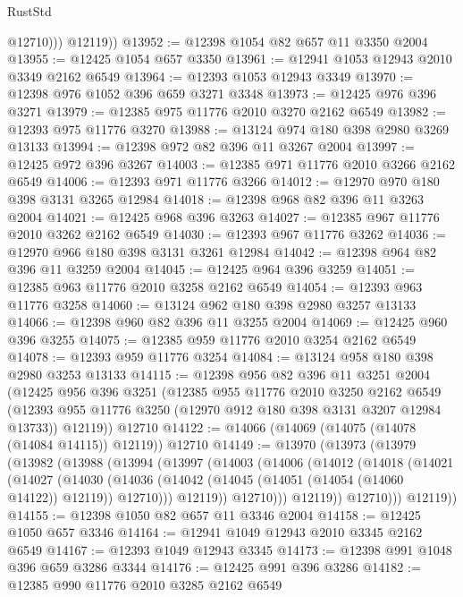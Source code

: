 \begin{lexlean}{RustStd}
\begin{coremodule}
              @12710)))
        @12119))
@13952 := @12398 @1054 @82 @657 @11 @3350 @2004
@13955 := @12425 @1054 @657 @3350
@13961 := @12941 @1053 @12943 @2010 @3349 @2162 @6549
@13964 := @12393 @1053 @12943 @3349
@13970 := @12398 @976 @1052 @396 @659 @3271 @3348
@13973 := @12425 @976 @396 @3271
@13979 := @12385 @975 @11776 @2010 @3270 @2162 @6549
@13982 := @12393 @975 @11776 @3270
@13988 := @13124 @974 @180 @398 @2980 @3269 @13133
@13994 := @12398 @972 @82 @396 @11 @3267 @2004
@13997 := @12425 @972 @396 @3267
@14003 := @12385 @971 @11776 @2010 @3266 @2162 @6549
@14006 := @12393 @971 @11776 @3266
@14012 := @12970 @970 @180 @398 @3131 @3265 @12984
@14018 := @12398 @968 @82 @396 @11 @3263 @2004
@14021 := @12425 @968 @396 @3263
@14027 := @12385 @967 @11776 @2010 @3262 @2162 @6549
@14030 := @12393 @967 @11776 @3262
@14036 := @12970 @966 @180 @398 @3131 @3261 @12984
@14042 := @12398 @964 @82 @396 @11 @3259 @2004
@14045 := @12425 @964 @396 @3259
@14051 := @12385 @963 @11776 @2010 @3258 @2162 @6549
@14054 := @12393 @963 @11776 @3258
@14060 := @13124 @962 @180 @398 @2980 @3257 @13133
@14066 := @12398 @960 @82 @396 @11 @3255 @2004
@14069 := @12425 @960 @396 @3255
@14075 := @12385 @959 @11776 @2010 @3254 @2162 @6549
@14078 := @12393 @959 @11776 @3254
@14084 := @13124 @958 @180 @398 @2980 @3253 @13133
@14115 := @12398
    @956
    @82
    @396
    @11
    @3251
    @2004
    (@12425
      @956
      @396
      @3251
      (@12385
        @955
        @11776
        @2010
        @3250
        @2162
        @6549
        (@12393 @955 @11776 @3250 (@12970 @912 @180 @398 @3131 @3207 @12984 @13733))
        @12119))
    @12710
@14122 := @14066 (@14069 (@14075 (@14078 (@14084 @14115)) @12119)) @12710
@14149 := @13970
    (@13973
      (@13979
        (@13982
          (@13988
            (@13994
              (@13997
                (@14003
                  (@14006
                    (@14012
                      (@14018
                        (@14021
                          (@14027
                            (@14030
                              (@14036
                                (@14042 (@14045 (@14051 (@14054 (@14060 @14122)) @12119)) @12710)))
                            @12119))
                        @12710)))
                  @12119))
              @12710)))
        @12119))
@14155 := @12398 @1050 @82 @657 @11 @3346 @2004
@14158 := @12425 @1050 @657 @3346
@14164 := @12941 @1049 @12943 @2010 @3345 @2162 @6549
@14167 := @12393 @1049 @12943 @3345
@14173 := @12398 @991 @1048 @396 @659 @3286 @3344
@14176 := @12425 @991 @396 @3286
@14182 := @12385 @990 @11776 @2010 @3285 @2162 @6549

\end{coremodule}
\end{lexlean}
